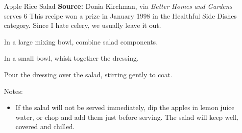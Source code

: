 \begin{recipe}{Apple Rice Salad}{}%
 {\textbf{Source:} Donia Kirchman, via \textit{Better Homes and Gardens} \hfill serves 6}
 \freeform This recipe won a prize in January 1998 in the Healthful Side Dishes category. Since I hate celery, we usually leave it out.

 In a large mixing bowl, combine salad components.

 In a small bowl, whisk together the dressing.

 \newstep Pour the dressing over the salad, stirring gently to coat.

 \freeform Notes:
 \begin{itemize}
  \item If the salad will not be served immediately, dip the apples in lemon juice water, or chop and add them just before serving. The salad will keep well, covered and chilled.
 \end{itemize}

\end{recipe}
